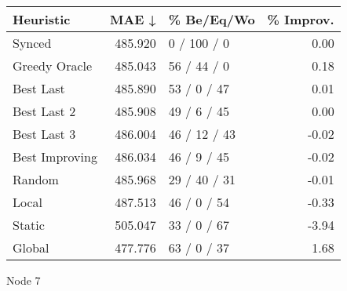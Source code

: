 \begin{tabular}{lrlr}
\toprule
\textbf{Heuristic} & \textbf{MAE ↓} & \textbf{\% Be/Eq/Wo} & \textbf{\% Improv.} \\
\midrule
            Synced &        485.920 &          0 / 100 / 0 &                0.00 \\
     Greedy Oracle &        485.043 &          56 / 44 / 0 &                0.18 \\
         Best Last &        485.890 &          53 / 0 / 47 &                0.01 \\
       Best Last 2 &        485.908 &          49 / 6 / 45 &                0.00 \\
       Best Last 3 &        486.004 &         46 / 12 / 43 &               -0.02 \\
    Best Improving &        486.034 &          46 / 9 / 45 &               -0.02 \\
            Random &        485.968 &         29 / 40 / 31 &               -0.01 \\
             Local &        487.513 &          46 / 0 / 54 &               -0.33 \\
            Static &        505.047 &          33 / 0 / 67 &               -3.94 \\
            Global &        477.776 &          63 / 0 / 37 &                1.68 \\
\bottomrule
\end{tabular}
\caption{Node 7}
\label{tab:non_lr01_le1_bs2_7}
